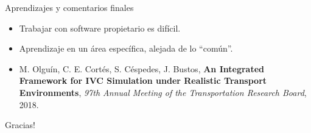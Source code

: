 \documentclass[aspectratio=169]{beamer}
\begin{document}
\begin{frame}{Aprendizajes y comentarios finales}
\begin{itemize}
    \item Trabajar con software propietario es difícil. \pause
    \item Aprendizaje en un área específica, alejada de lo ``común''. \pause
    \item M. Olguín, C. E. Cortés, S. Céspedes, J. Bustos, \textbf{An Integrated Framework for IVC Simulation under Realistic Transport Environments}, \textit{97th Annual Meeting of the Transportation Research Board}, 2018.
\end{itemize}
\end{frame}

\begin{frame}[standout]
Gracias!
\end{frame}
\end{document}
